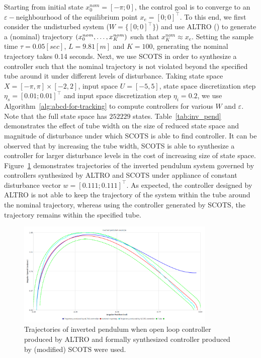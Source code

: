 Starting from initial state $x_0^{nom}=[-\pi;0]$, the control goal is to converge to an $\varepsilon-$neighbourhood of the equilibrium point 
$x_e=[0;0]^\top$. To this end, we first consider the undisturbed system ($W=\{[0;0]^\top\}$)  and use ALTRO () to generate a (nominal) trajectory $(x_0^{\mathit{nom}},\ldots,x_K^{\mathit{nom}})$ such that $x_K^{nom}\approx x_e$. Setting the sample time $\tau=0.05[sec]$, $L=9.81[m]$ and $K=100$, generating the nominal trajectory takes 0.14 seconds. Next, we use SCOTS in order to synthesize a controller such that the nominal trajectory is not violated beyond the specified tube around it under different levels of disturbance. Taking state space $X=[-\pi,\pi]\times[-2,2]$, input space $U=[-5,5]$, state space discretization step $\eta_s=[0.01;0.01]^\top$ and input space discretization step $\eta_i=0.2$, we use Algorithm~\ref{alg:abcd-for-tracking} to compute controllers for various $W$ and $\varepsilon$. Note that the full state space has $252229$ states. Table~\ref{tab:inv_pend} demonstrates the effect of tube width on the size of reduced state space and magnitude of disturbance under which SCOTS is able to find controller. It can be observed that by increasing the tube width, SCOTS is able to synthesize a controller for larger disturbance levels in the cost of increasing size of state space. Figure~\ref{fig:invpend_traj} demonstrates trajectories of the inverted pendulum system governed by controllers synthesized by ALTRO and SCOTS under appliance of constant disturbance vector $w=[0.111;0.111]^\top$. As expected, the controller designed by ALTRO is not able to keep the trajectory of the system within the tube around the nominal trajectory, whereas using the controller generated by SCOTS, the trajectory remains within the specified tube.
\begin{figure}\label{fig:invpend_traj}
	\centering
	\includegraphics[width=0.85\textwidth]{traj_inv_pend.png}
	\caption{Trajectories of inverted pendulum when open loop controller produced by ALTRO and formally synthesized controller produced by (modified) SCOTS were used.}
\end{figure}
